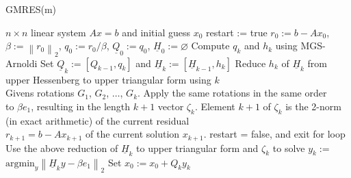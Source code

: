 \documentclass{scrartcl}
\numberwithin{equation}{section}
\newcommand{\norm}[1]{\left\lVert#1\right\rVert}
\begin{document}
\begin{algorithm}
\caption{GMRES(m)}
\label{alg:gmres(m)}
\begin{algorithmic}[1]
    \REQUIRE $n \times n$ linear system $Ax = b$ and initial guess $x_0$
    \STATE restart := true
    	\STATE $r_0:=b - Ax_0$, $\beta := \norm{r_0}_2$, $q_0 := r_0/\beta$, $\underline{Q}_0 := q_0$, $\underline{H}_0 := \varnothing$
			\STATE Compute $q_k$ and $h_k$ using MGS-Arnoldi
			\STATE Set $\underline{Q}_k := [Q_{k-1},q_k]$ and $\underline{H}_k := [\underline{H}_{k -1}, h_k]$
			\STATE Reduce ${h_k}$ of $\underline{H}_k$ from upper Hessenberg to upper triangular form using $k$ \\
		\hspace{\algorithmicindent} Givens rotations $G_1$, $G_2$, $ \ldots$, $G_{k}$. Apply the same rotations in the same order \\ 
		\hspace{\algorithmicindent} to $\beta e_1$,  resulting in the length $k + 1$ vector $\zeta_{k}$.
			\STATE Element $k + 1$ of $\zeta_k$ is the 2-norm (in exact arithmetic) of the current residual \\
\hspace{\algorithmicindent} $r_{k + 1} = b - Ax_{k + 1}$ of the current solution $x_{k + 1}$.
			\STATE restart = false, and exit for loop		
		\ENDIF
		\ENDFOR
		\STATE Use the above reduction of $\underline{H}_k$ to upper triangular form and $\zeta_k$ to solve $y_k :=$ \\ \hspace{\algorithmicindent} $\text{argmin}_{y} \norm{\underline{H}_k y - \beta e_1}_2$
		\STATE Set $x_0 := x_0 + Q_k y_k$
	\ENDWHILE 
\end{algorithmic}
\end{algorithm}

\end{document}
